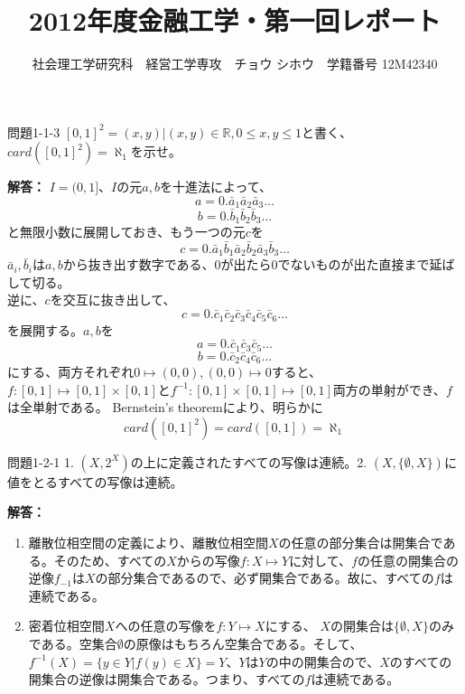 \documentclass{jsarticle}
\begin{document}
\title{2012年度金融工学・第一回レポート}
\author{{\normalsize 社会理工学研究科　経営工学専攻　チョウ シホウ　学籍番号 12M42340}}
\date{}
\maketitle

\def \Pr{{\rm Pr}}


\baselineskip 0.6cm

\begin{itembox}[l]{問題1-1-3}
$[0,1]^2={(x,y)|(x,y) \in \mathbb{R}, 0 \le x, y \le 1 }$と書く、
$card([0,1]^2) = \aleph_{1}を示せ。$
\end{itembox}
{\bf 解答：}
$I=(0,1]$、$I$の元$a,b$を十進法によって、
\[ a = 0.\bar{a}_{1}\bar{a}_{2}\bar{a}_{3}\dots \]
\[ b = 0.\bar{b}_{1}\bar{b}_{2}\bar{b}_{3}\dots \]
と無限小数に展開しておき、もう一つの元$c$を
\[ c = 0.\bar{a}_{1}\bar{b}_{1}\bar{a}_{2}\bar{b}_{2}\bar{a}_{3}\bar{b}_{3}\dots \]
$\bar{a}_{i},\bar{b}_{i}$は$a,b$から抜き出す数字である、$0$が出たら$0$でないものが出た直接まで延ばして切る。 \\
逆に、$c$を交互に抜き出して、
\[ c = 0.\bar{c}_{1}\bar{c}_{2}\bar{c}_{3}\bar{c}_{4}\bar{c}_{5}\bar{c}_{6}\dots \]
を展開する。$a,b$を
\[ a = 0.\bar{c}_{1}\bar{c}_{3}\bar{c}_{5}\dots \]
\[ b = 0.\bar{c}_{2}\bar{c}_{4}\bar{c}_{6}\dots \]
にする、両方それぞれ$0 \mapsto (0,0), (0,0) \mapsto 0$すると、$f:[0,1]\mapsto[0,1]\times[0,1]$と$f^{-1}:[0,1]\times[0,1]\mapsto[0,1]$両方の単射ができ、$f$は全単射である。
Bernstein's theoremにより、明らかに
\[ card([0,1]^2)=card([0,1])=\aleph_{1} \]

\begin{itembox}[l]{問題1-2-1} 1. $(X,2^{X})$の上に定義されたすべての写像は連続。2. $(X,\{\emptyset,X\})$に値をとるすべての写像は連続。\end{itembox}
{\bf 解答：}
\begin{enumerate}
\item
離散位相空間の定義により、離散位相空間$X$の任意の部分集合は開集合である。そのため、すべての$X$からの写像$f:X\mapsto Y$に対して、$f$の任意の開集合の逆像$f_{-1}$は$X$の部分集合であるので、必ず開集合である。故に、すべての$f$は連続である。
\item
密着位相空間$X$への任意の写像を$f:Y\mapsto X$にする、 $X$の開集合は$\{\emptyset,X\}$のみである。空集合$\emptyset$の原像はもちろん空集合である。そして、$f^{-1}(X) = \{y \in Y | f(y) \in X \} = Y$、$Y$は$Y$の中の開集合ので、$X$のすべての開集合の逆像は開集合である。つまり、すべての$f$は連続である。
\end{enumerate}
\end{document}
